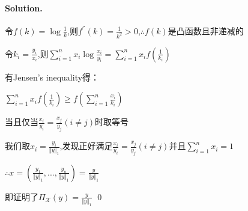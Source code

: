 \documentclass[a4paper]{article}
\newenvironment{solution}
{\color{blue} \paragraph{Solution.}}
{\newline \qed}
\begin{document}
\begin{solution}
令$f(k)=\log \frac{1}{k}$,则$f^{''}(k)=\frac{1}{k^2}>0$,$\therefore f(k)$是凸函数且非递减的

令$k_i=\frac{y_i}{x_i}$,则$\sum^n_{i=1}x_i\log \frac{x_i}{y_i}=\sum^n_{i=1}x_i f(\frac{1}{k_i})$

有Jensen's inequality得：

$\sum^n_{i=1}x_i f(\frac{1}{k_i}) \geq f(\sum^n_{i=1}\frac{x_i}{k_i})$

当且仅当$\frac{x_i}{y_i}=\frac{x_j}{y_j}(i\neq j)$时取等号

我们取$x_i=\frac{y_i}{\Vert y \Vert_1}$,发现正好满足$\frac{x_i}{y_i}=\frac{x_j}{y_j}(i\neq j)$并且$\sum_{i=1}^n x_i=1$

$\therefore x=(\frac{y_1}{\Vert y \Vert_1},...,\frac{y_n}{\Vert y \Vert_1})=\frac{y}{\Vert y \Vert_1}$

即证明了$\Pi_{\mathcal{X}}(y)=\frac{y}{\Vert y \Vert_1}$
\end{solution}
\end{document}
